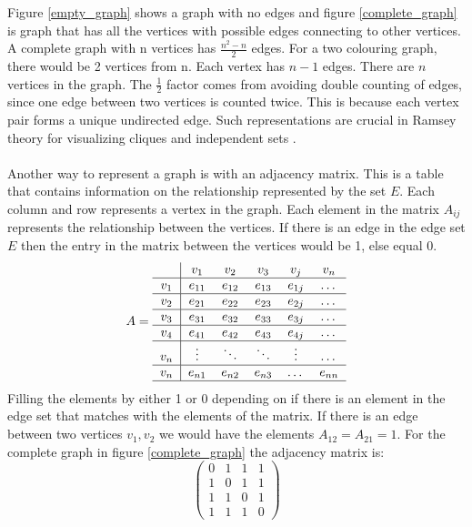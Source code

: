 \documentclass{Assignment}
\begin{document}
Figure \ref{empty_graph} shows a graph with no edges and figure \ref{complete_graph} is graph that has all the vertices with possible edges connecting to other vertices.
A complete graph with n vertices has ${\frac{n^2-n}{2}}$ edges.
For a two colouring graph, there would be 2 vertices from n. 
Each vertex has $n-1$ edges.
There are $n$ vertices in the graph.
The $\frac{1}{2}$ factor comes from avoiding double counting of edges, since one edge between two vertices is counted twice.
This is because each vertex pair forms a unique undirected edge.
Such representations are crucial in Ramsey theory for visualizing cliques and independent sets \cite{BondyMurty2008}.
\\\\
Another way to represent a graph is with an adjacency matrix.
This is a table that contains information on the relationship represented by the set $ E$.
Each column and row represents a vertex in the graph.
Each element in the matrix $A_{ij}$ represents the relationship between the vertices.
If there is an edge in the edge set $E$ then the entry in the matrix between the vertices would be 1, else equal 0.
\begin{equation}
	A = \begin{tabular}{c|ccccc}
		& $v_1$ & $v_2$ & $v_3$ & $v_j$ & $v_n$ \\ \hline
		$v_1$ & $e_{11}$ & $e_{12}$ & $e_{13}$ & $e_{1j}$ & $\dots$ \\ \hline
		$v_2$ & $e_{21}$ & $e_{22}$ & $e_{23}$ & $e_{2j}$ & $\dots$ \\ \hline
		$v_3$ & $e_{31}$ & $e_{32}$ & $e_{33}$ & $e_{3j}$ & $\dots$ \\ \hline
		$v_4$ & $e_{41}$ & $e_{42}$ & $e_{43}$ & $e_{4j}$ & $\dots$ \\ \hline
		$v_n$ & $\vdots$ & $\ddots$ & $\ddots$ & $\vdots$ & $\dots$ \\ \hline
		$v_n$ & $e_{n1}$ & $e_{n2}$ & $e_{n3}$ & $\dots$ & $e_{nn}$ \\ \hline
	\end{tabular}
\end{equation}
Filling the elements by either 1 or 0 depending on if there is an element in the edge set that matches with the elements of the matrix.
If there is an edge between two vertices $v_1 ,v_2$ we would have the elements $A_{12} = A_{21}=1$. 
For the complete graph in figure \ref{complete_graph} the adjacency matrix is:
\begin{equation}
	\begin{pmatrix}
		0&1&1&1\\
		1&0&1&1\\
		1&1&0&1\\
		1&1&1&0
	\end{pmatrix}
\end{equation}
\end{document}

